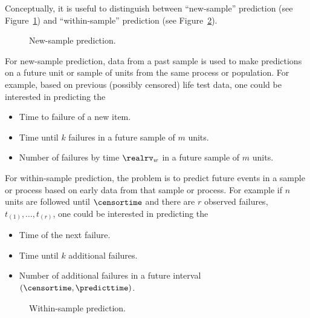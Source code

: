 Conceptually, it is useful to distinguish between ``new-sample''
prediction (see Figure~\ref{figure:newsamplefig.ps}) and
``within-sample'' prediction (see
Figure~\ref{figure:withinsamplefig.ps}).
\begin{figure}
\caption{New-sample prediction.}
\label{figure:newsamplefig.ps}
\end{figure}
For new-sample
prediction, data from a past sample is used to make predictions on a
future unit or sample of units from the same process or population.
For example, based on previous (possibly censored) life test data,
one could be interested in predicting the	
\begin{itemize} 
\item 
Time to failure of a new item.
\item 
Time until $k$ failures in a future sample of $m$ units.
\item 
Number of failures by time $\realrv_{w}$ in a future sample of
$m$ units.
\end{itemize} 

For within-sample prediction, the problem is to predict future events
in a sample or process based on early data from that sample or
process.
For example if $n$ units are followed until $\censortime$
and there are $r$ observed failures, $t_{(1)}, \ldots, t_{(r)}$, one could 
be interested in predicting the
\begin{itemize} 
\item 
Time of the next failure. 
\item 
Time until $k$ additional failures.
\item 
Number of additional failures in a future interval $(\censortime,
\predicttime)$.
\end{itemize} 
\begin{figure}
\caption{Within-sample prediction.}
\label{figure:withinsamplefig.ps}
\end{figure}

